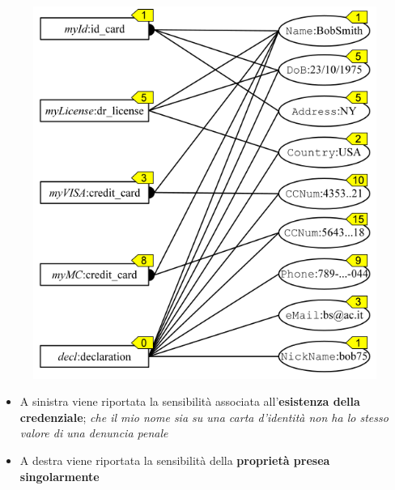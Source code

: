 \documentclass{report}
\begin{document}
\begin{figure}[ht]
    \centering
    \includegraphics[width=0.75\linewidth]{images/cred-prop-sens.png}
\end{figure}

\begin{itemize}
    \item A sinistra viene riportata la sensibilità associata all'\textbf{esistenza della credenziale};
    \textit{che il mio nome sia su una carta d'identità non ha lo stesso valore di una denuncia penale}
    \item A destra viene riportata la sensibilità della \textbf{proprietà presea singolarmente}
\end{itemize}

\newpage
\end{document}
